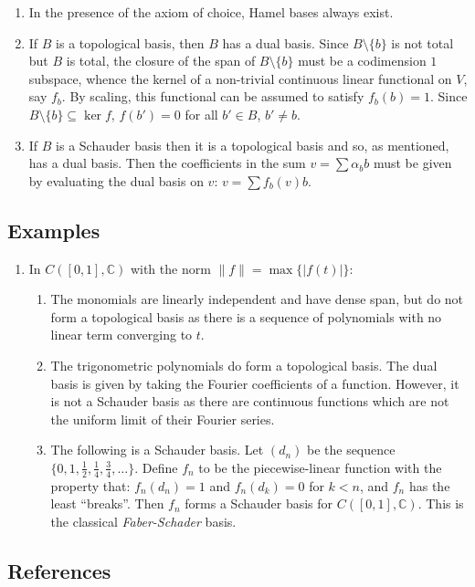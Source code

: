 \documentclass[preprint, 5p, 10pt]{elsarticle}
\theoremstyle{plain}
\newcommand{\lt}{<}
\begin{document}
\begin{enumerate}%
\item In the presence of the axiom of choice, Hamel bases always exist.


\item If $B$ is a topological basis, then $B$ has a dual basis. Since $B \setminus \{b\}$ is not total but $B$ is total, the closure of the span of $B \setminus \{b\}$ must be a codimension $1$ subspace, whence the kernel of a non-trivial continuous linear functional on $V$, say $f_b$. By scaling, this functional can be assumed to satisfy $f_b(b) = 1$. Since $B \setminus \{b\} \subseteq \ker f$, $f(b') = 0$ for all $b' \in B$, $b' \ne b$.


\item If $B$ is a Schauder basis then it is a topological basis and so, as mentioned, has a dual basis. Then the coefficients in the sum $v = \sum \alpha_b b$ must be given by evaluating the dual basis on $v$: $v = \sum f_b(v) b$.



\end{enumerate}
\subsection*{{Examples}}\label{examples_5}

\begin{enumerate}%
\item In $C([0,1],\mathbb{C})$ with the norm ${\|f\|} = \max\{{|f(t)|}\}$:

\begin{enumerate}%
\item The monomials are linearly independent and have dense span, but do not form a topological basis as there is a sequence of polynomials with no linear term converging to $t$.


\item The trigonometric polynomials do form a topological basis. The dual basis is given by taking the Fourier coefficients of a function. However, it is not a Schauder basis as there are continuous functions which are not the uniform limit of their Fourier series.


\item The following is a Schauder basis. Let $(d_n)$ be the sequence $\{0, 1, \frac{1}{2}, \frac{1}{4}, \frac{3}{4}, \dots\}$. 
Define $f_n$ to be the piecewise-linear function with the property that: $f_n(d_n) = 1$ and $f_n(d_k) = 0$ for $k \lt n$, and $f_n$
 has the least ``breaks''. Then $f_n$ forms a Schauder basis for $C([0,1],\mathbb{C})$. This is the classical \emph{Faber-Schader} basis.



\end{enumerate}


\end{enumerate}
\hypertarget{references_6}{}\subsection*{{References}}\label{references_6}
\end{document}

